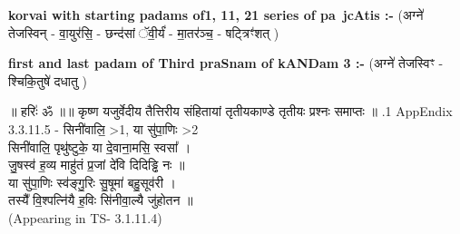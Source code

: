 \documentclass[17pt]{extarticle}
\begin{document}
        \textbf{korvai with starting padams of1, 11, 21 series of pa~jcAtis :-} \newline
        (अग्ने॑ तेजस्विन् - वा॒युर॑सि॒ - छन्द॑सां ॅवी॒र्यं॑ - मा॒तर॑ञ्च॒ - षट्त्रिꣳ॑शत् ) \newline

        \textbf{first and last padam of Third praSnam of kANDam 3 :-} \newline
        (अग्ने॑ तेजस्विꣳ - श्चिकि॒तुषे॑ दधातु ) \newline 

        
        ॥ हरिः॑ ॐ ॥॥ कृष्ण यजुर्वेदीय तैत्तिरीय संहितायां तृतीयकाण्डे तृतीयः प्रश्नः समाप्तः ॥ \newline
        .1   AppEndix\\3.3.11.5 - सिनी॑वालि॒ >1, या सु॑पा॒णिः >2\\सिनी॑वालि॒ पृथु॑ष्टुके॒ या दे॒वाना॒मसि॒ स्वसा᳚ । \\जु॒षस्व॑ ह॒व्य माहु॑तं प्र॒जां दे॑वि दिदिड्ढि नः ॥\\या सु॑पा॒णिः स्व॑ङ्गु॒रिः सु॒षूमा॑ बहु॒सूव॑री । \\तस्यै᳚ वि॒श्पत्नि॑यै ह॒विः सि॑नीवा॒ल्यै जु॑होतन ॥ \\(Appearing in TS- 3.1.11.4)\\
                \pagebreak
        
\end{document}

